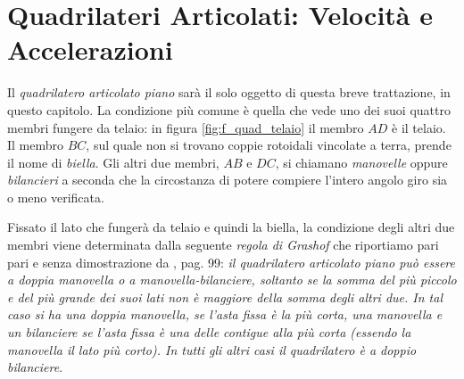 \section{Quadrilateri Articolati: Velocit\`a e Accelerazioni}

\noindent Il {\em quadrilatero articolato piano}
sar\`a il solo oggetto di questa breve trattazione, in questo capitolo.
La condizione pi\`u comune \`e quella che vede
uno dei suoi quattro membri fungere da telaio: in figura
\ref{fig:f_quad_telaio} il membro $AD$ \`e il telaio. 
Il membro $BC$, sul quale non si trovano coppie rotoidali vincolate
a terra, prende il nome di {\em biella}. Gli altri due membri, $AB$ e $DC$, 
si chiamano {\em manovelle} oppure
{\em bilancieri} a seconda che la circostanza di potere
compiere l'intero angolo giro sia o meno verificata.

\noindent Fissato il lato che funger\`a da telaio e quindi la biella, la condizione degli
altri due membri viene determinata dalla seguente
{\em regola di Grashof}
che riportiamo pari pari e senza dimostrazione da \cite{sesini1}, pag. 99:
{\em il quadrilatero articolato piano pu\`o essere a doppia manovella o
a manovella-bilanciere,
soltanto se la somma del pi\`u piccolo e del pi\`u grande dei suoi lati non \`e
maggiore della somma degli altri due. In tal caso si ha una doppia manovella,
se l'asta fissa \`e la pi\`u corta, una manovella e un bilanciere se l'asta
fissa \`e una delle contigue alla pi\`u corta (essendo la manovella il lato pi\`u corto).
In tutti gli altri casi il quadrilatero \`e a doppio bilanciere}.

